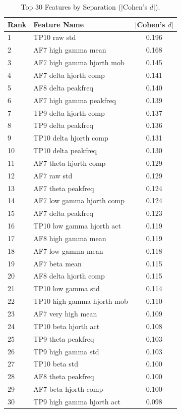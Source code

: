 \begin{table}[H]
\centering
\begin{tabular}{llc}
\hline
Rank & Feature Name & $|$Cohen's $d|$ \\
\hline
1 & TP10 raw std & 0.196 \\
2 & AF7 high gamma mean & 0.168 \\
3 & AF7 high gamma hjorth mob & 0.145 \\
4 & AF7 delta hjorth comp & 0.141 \\
5 & AF8 delta peakfreq & 0.140 \\
6 & AF7 high gamma peakfreq & 0.139 \\
7 & TP9 delta hjorth comp & 0.137 \\
8 & TP9 delta peakfreq & 0.136 \\
9 & TP10 delta hjorth comp & 0.131 \\
10 & TP10 delta peakfreq & 0.130 \\
11 & AF7 theta hjorth comp & 0.129 \\
12 & AF7 raw std & 0.129 \\
13 & AF7 theta peakfreq & 0.124 \\
14 & AF7 low gamma hjorth comp & 0.124 \\
15 & AF7 delta peakfreq & 0.123 \\
16 & TP10 low gamma hjorth act & 0.119 \\
17 & AF8 high gamma mean & 0.119 \\
18 & AF7 low gamma mean & 0.118 \\
19 & AF7 beta mean & 0.115 \\
20 & AF8 delta hjorth comp & 0.115 \\
21 & TP10 low gamma std & 0.114 \\
22 & TP10 high gamma hjorth mob & 0.110 \\
23 & AF7 very high mean & 0.109 \\
24 & TP10 beta hjorth act & 0.108 \\
25 & TP9 theta peakfreq & 0.103 \\
26 & TP9 high gamma std & 0.103 \\
27 & TP10 beta std & 0.100 \\
28 & AF8 theta peakfreq & 0.100 \\
29 & AF7 beta hjorth comp & 0.100 \\
30 & TP9 high gamma hjorth act & 0.098 \\
\hline
\end{tabular}
\caption{Top 30 Features by Separation ($|$Cohen's $d|$).}
\label{tab:cohend_top_features}
\end{table}
